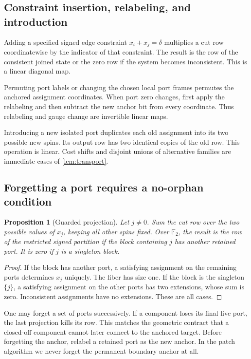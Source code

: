 \documentclass[11pt,letterpaper]{article}
\newtheorem{proposition}[theorem]{Proposition}
\theoremstyle{definition}
\newcommand{\F}{\mathbb F}
\begin{document}
\subsection{Constraint insertion, relabeling, and introduction}
Adding a specified signed edge constraint $x_i+x_j=\delta$ multiplies a cut row coordinatewise by the indicator of that constraint. The result is the row of the consistent joined state or the zero row if the system becomes inconsistent. This is a linear diagonal map.

Permuting port labels or changing the chosen local port frames permutes the anchored assignment coordinates. When port zero changes, first apply the relabeling and then subtract the new anchor bit from every coordinate. Thus relabeling and gauge change are invertible linear maps.

Introducing a new isolated port duplicates each old assignment into its two possible new spins. Its output row has two identical copies of the old row. This operation is linear. Cost shifts and disjoint unions of alternative families are immediate cases of \cref{lem:transport}.

\subsection{Forgetting a port requires a no-orphan condition}
\begin{proposition}[Guarded projection]\label{prop:forget}
Let $j\ne0$. Sum the cut row over the two possible values of $x_j$, keeping all other spins fixed. Over $\F_2$, the result is the row of the restricted signed partition if the block containing $j$ has another retained port. It is zero if $j$ is a singleton block.
\end{proposition}
\begin{proof}
If the block has another port, a satisfying assignment on the remaining ports determines $x_j$ uniquely. The fiber has size one. If the block is the singleton $\{j\}$, a satisfying assignment on the other ports has two extensions, whose sum is zero. Inconsistent assignments have no extensions. These are all cases.
\end{proof}
One may forget a set of ports successively. If a component loses its final live port, the last projection kills its row. This matches the geometric contract that a closed-off component cannot later connect to the anchored target. Before forgetting the anchor, relabel a retained port as the new anchor. In the patch algorithm we never forget the permanent boundary anchor at all.
\end{document}
